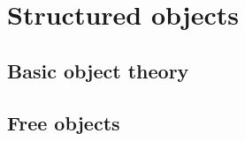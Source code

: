 \part{Structured objects}

\chapter{Basic object theory}
    
    
    
    

\chapter{Free objects}
    